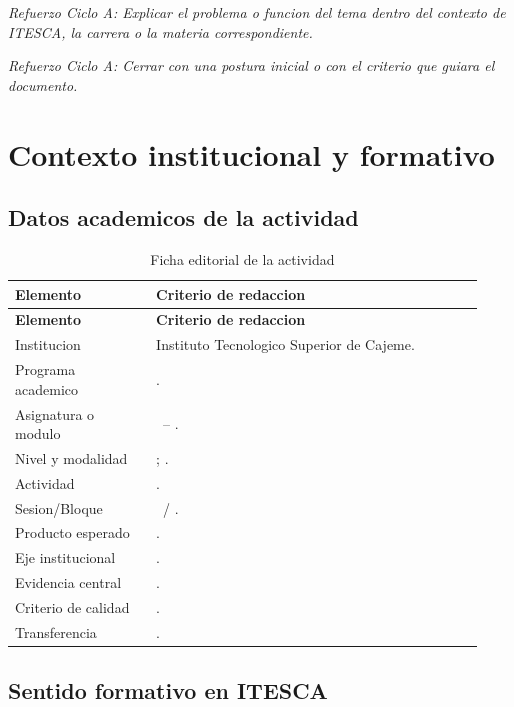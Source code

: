 \documentclass[
	spanish,
	letterpaper, oneside
]{article}
\def\universityname {Instituto Tecnologico Superior de Cajeme}
\begin{document}
\textit{Refuerzo Ciclo A: Explicar el problema o funcion del tema dentro del contexto de ITESCA, la carrera o la materia correspondiente.}

\textit{Refuerzo Ciclo A: Cerrar con una postura inicial o con el criterio que guiara el documento.}


\section{Contexto institucional y formativo}

\subsection{Datos academicos de la actividad}

\begin{longtable}{@{}p{0.28\linewidth}p{0.65\linewidth}@{}}
	\caption{Ficha editorial de la actividad}\label{tab:ficha-editorial-itesca}\\
	\toprule
	\textbf{Elemento} & \textbf{Criterio de redaccion} \\
	\midrule
	\endfirsthead
	\toprule
	\textbf{Elemento} & \textbf{Criterio de redaccion} \\
	\midrule
	\endhead
	Institucion & \universityname. \\
	Programa academico & \itescafaculty. \\
	Asignatura o modulo & \itescacoursecode\ -- \itescacoursename. \\
	Nivel y modalidad & \itescaprogramlevel; \itescamodality. \\
	Actividad & \itescaactivityname. \\
	Sesion/Bloque & \itescasessionname\ / \itescablockname. \\
	Producto esperado & \itescamainproduct. \\
	Eje institucional & \itescainstitutionalaxis. \\
	Evidencia central & \itescaevidencefocus. \\
	Criterio de calidad & \itescaqualitycriterion. \\
	Transferencia & \itescatransfercontext. \\
	\bottomrule
\end{longtable}

\subsection{Sentido formativo en ITESCA}
\end{document}
